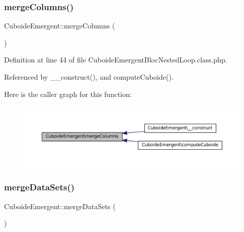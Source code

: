 \mbox{\label{class_cuboide_emergent_afa115b70971c1b778813134a55406144}} 
\subsubsection{\texorpdfstring{merge\+Columns()}{mergeColumns()}\hspace{0.1cm}{\footnotesize\ttfamily [2/2]}}
{\footnotesize\ttfamily Cuboide\+Emergent\+::merge\+Columns (\begin{DoxyParamCaption}{ }\end{DoxyParamCaption})\hspace{0.3cm}{\ttfamily [protected]}}



Definition at line 44 of file Cuboide\+Emergent\+Bloc\+Nested\+Loop.\+class.\+php.



Referenced by \+\_\+\+\_\+construct(), and compute\+Cuboide().

Here is the caller graph for this function\+:\nopagebreak
\begin{figure}[H]
\begin{center}
\leavevmode
\includegraphics[width=350pt]{class_cuboide_emergent_afa115b70971c1b778813134a55406144_icgraph}
\end{center}
\end{figure}
\mbox{\label{class_cuboide_emergent_af81c6eabb87ff572c306a96334c7062d}} 
\subsubsection{\texorpdfstring{merge\+Data\+Sets()}{mergeDataSets()}\hspace{0.1cm}{\footnotesize\ttfamily [1/2]}}
{\footnotesize\ttfamily Cuboide\+Emergent\+::merge\+Data\+Sets (\begin{DoxyParamCaption}{ }\end{DoxyParamCaption})\hspace{0.3cm}{\ttfamily [protected]}}



